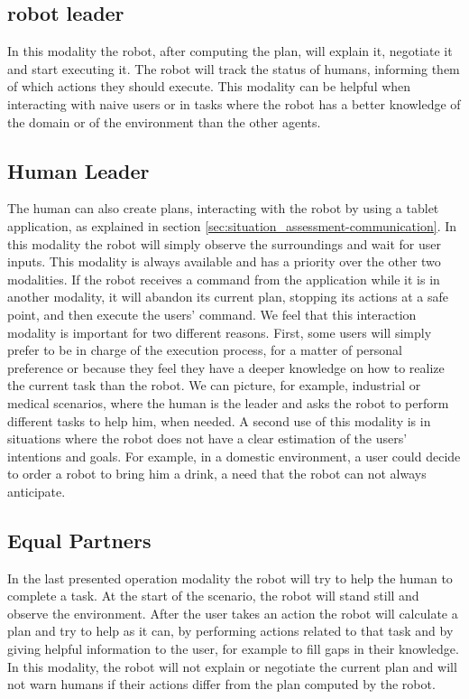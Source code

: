\subsection{robot leader}
In this modality the robot, after computing the plan, will explain it, negotiate it and start executing it.
The robot will track the status of humans, informing them of which actions they should execute. This modality can be helpful when interacting with  naive users or in tasks where the robot has a better knowledge of the
domain or of the environment than the other agents.

\subsection{Human Leader}
The human can also create plans, interacting with the robot by using a
tablet application, as explained in section \ref{sec:situation_assessment-communication}. In this modality the robot   
will simply observe the surroundings and wait for user inputs. This modality is always available and has a priority over
the other two modalities. If the robot receives a command from the
application while it is in another modality, it will abandon its current
plan, stopping its actions at a safe point, and then execute the users'
command. We feel that this interaction modality is important for two
different reasons.  First, some users will simply prefer to be in
charge of the execution process, for a matter of personal preference or because they
feel they have a deeper knowledge on how to realize the current task
than the robot. We can picture, for example, industrial or medical
scenarios, where the human is the leader and asks the robot to perform
different tasks to help him, when needed. A second use of this modality is in situations where
the robot does not have  a clear estimation of the users' intentions and
goals. For example, in a domestic environment, a user could decide to
order a robot to bring him a drink, a need that the robot can not always anticipate.

\subsection{Equal Partners}
In the last presented operation modality the robot will try to help
the human to complete a task. At the start of the scenario, the robot
will stand still and observe the environment. After the user takes an
action the robot will calculate a plan and try to help as it can, by
performing actions related to that task and by giving helpful information to
the user, for example to fill gaps in their knowledge. In this modality, 
the robot will not explain or negotiate the current plan and will not warn humans if
their actions differ from the plan computed by the robot.

